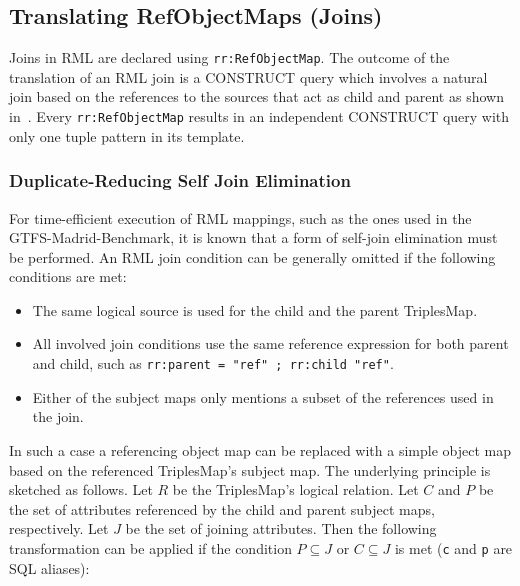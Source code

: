 \subsection{Translating RefObjectMaps (Joins)}
Joins in RML are declared using \texttt{rr:RefObjectMap}. The outcome of the translation of an RML join is a CONSTRUCT query which involves a natural join based on the references to the sources that act as child and parent as shown in~.
Every \texttt{rr:RefObjectMap} results in an independent CONSTRUCT query with only one tuple pattern in its template.

\subsubsection{Duplicate-Reducing Self Join Elimination}
For time-efficient execution of RML mappings, such as the ones used in the GTFS-Madrid-Benchmark, it is known that a form of self-join elimination must be performed\cite{Iglesias2020, arenas2022morphkgc}.
An RML join condition can be generally omitted if the following conditions are met:
\begin{itemize}
    \setlength\itemsep{-0.5em}
    \item The same logical source is used for the child and the parent TriplesMap.
    \item All involved join conditions use the same reference expression for both parent and child, such as \lstinline{rr:parent = "ref" ; rr:child "ref"}.
    \item Either of the subject maps only mentions a subset of the references used in the join.
\end{itemize}
In such a case a referencing object map can be replaced with a simple object map based on the referenced TriplesMap's subject map. The underlying principle is sketched as follows. Let $R$ be the TriplesMap's logical relation. Let $C$ and $P$ be the set of attributes referenced by the child and parent subject maps, respectively. Let $J$ be the set of joining attributes. Then the following transformation can be applied if the condition $P \subseteq J$ or $C \subseteq J$ is met (\texttt{c} and \texttt{p} are SQL aliases):

